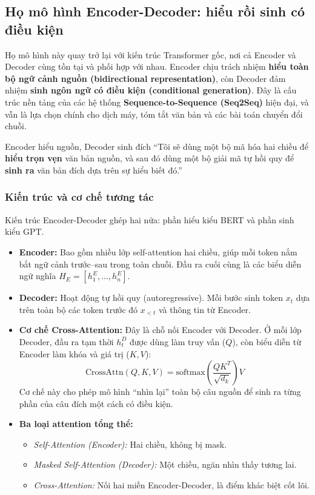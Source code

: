 \subsection{Họ mô hình Encoder-Decoder: hiểu rồi sinh có điều kiện}
\label{ssec:encoder_decoder_models}

Họ mô hình này quay trở lại với kiến trúc Transformer gốc, nơi cả Encoder và Decoder cùng tồn tại và phối hợp với nhau.
Encoder chịu trách nhiệm \textbf{hiểu toàn bộ ngữ cảnh nguồn (bidirectional representation)},
còn Decoder đảm nhiệm \textbf{sinh ngôn ngữ có điều kiện (conditional generation)}.
Đây là cấu trúc nền tảng của các hệ thống \textbf{Sequence-to-Sequence (Seq2Seq)} hiện đại,
và vẫn là lựa chọn chính cho dịch máy, tóm tắt văn bản và các bài toán chuyển đổi chuỗi.

\begin{keyidea}{Encoder hiểu nguồn, Decoder sinh đích}
	“Tôi sẽ dùng một bộ mã hóa hai chiều để \textbf{hiểu trọn vẹn} văn bản nguồn,
	và sau đó dùng một bộ giải mã tự hồi quy để \textbf{sinh ra} văn bản đích dựa trên sự hiểu biết đó.”
\end{keyidea}

\subsubsection{Kiến trúc và cơ chế tương tác}
Kiến trúc Encoder-Decoder ghép hai nửa: phần hiểu kiểu BERT và phần sinh kiểu GPT.

\begin{itemize}
	\item \textbf{Encoder:} Bao gồm nhiều lớp self-attention hai chiều, giúp mỗi token nắm bắt ngữ cảnh trước–sau trong toàn chuỗi. 
	Đầu ra cuối cùng là các biểu diễn ngữ nghĩa $H_E = [h_1^E, \dots, h_n^E]$.
	
	\item \textbf{Decoder:} Hoạt động tự hồi quy (autoregressive). Mỗi bước sinh token $x_t$ dựa trên toàn bộ các token trước đó $x_{<t}$ và thông tin từ Encoder.
	
	\item \textbf{Cơ chế Cross-Attention:}
	Đây là chỗ nối Encoder với Decoder. Ở mỗi lớp Decoder, đầu ra tạm thời $h_t^D$ được dùng làm truy vấn ($Q$),
	còn biểu diễn từ Encoder làm khóa và giá trị ($K, V$):
	\[
	\text{CrossAttn}(Q, K, V) = \text{softmax}\left(\frac{Q K^T}{\sqrt{d_k}}\right)V
	\]
	Cơ chế này cho phép mô hình “nhìn lại” toàn bộ câu nguồn để sinh ra từng phần của câu đích một cách có điều kiện.
	
	\item \textbf{Ba loại attention tổng thể:}
	\begin{itemize}
		\item \textit{Self-Attention (Encoder):} Hai chiều, không bị mask.
		\item \textit{Masked Self-Attention (Decoder):} Một chiều, ngăn nhìn thấy tương lai.
		\item \textit{Cross-Attention:} Nối hai miền Encoder-Decoder, là điểm khác biệt cốt lõi.
	\end{itemize}
\end{itemize}

